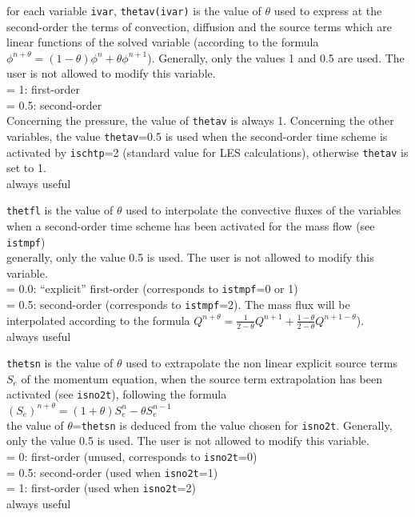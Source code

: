 {for each variable {\tt ivar}, {\tt thetav(ivar)} is the value of $\theta$ used to
express at the second-order the terms of convection, diffusion and the
source terms which are linear functions of the solved variable
(according to the formula
$\phi^{n+\theta}=(1-\theta)\phi^n+\theta\phi^{n+1}$). Generally,
only the values 1 and 0.5 are used. The user is not allowed to modify
this variable.\\
\hspace*{1.3cm}= 1: first-order \\
\hspace*{1.3cm}= 0.5: second-order \\
Concerning the pressure, the value of {\tt thetav} is always 1. Concerning
the other variables, the value {\tt thetav}=0.5 is used when the
second-order time scheme is activated by {\tt ischtp}=2 (standard value for
LES calculations), otherwise {\tt thetav} is set to 1.\\
always useful}

{{\tt thetfl} is the value of $\theta$ used to
interpolate the convective fluxes of the variables when a second-order time
scheme has been activated for the mass flow (see {\tt istmpf})\\
generally, only the value 0.5 is used. The user is not allowed to
modify this variable.\\
\hspace*{1.3cm}= 0.0: ``explicit'' first-order (corresponds to
{\tt istmpf}=0 or 1)\\
\hspace*{1.3cm}= 0.5: second-order (corresponds to {\tt istmpf}=2). The mass
flux will be interpolated according to the formula
$Q^{n+\theta}=\frac{1}{2-\theta}Q^{n+1}+\frac{1-\theta}{2-\theta}Q^{n+1-\theta}$).\\
always useful}

{{\tt thetsn} is the value of $\theta$ used to
extrapolate the non linear explicit source terms $S_e$ of the momentum equation,
when the source term extrapolation has been activated (see {\tt isno2t}),
following the formula\\
$(S_e)^{n+\theta}=(1+\theta)S_e^n-\theta S_e^{n-1}$\\
the value
of $\theta$={\tt thetsn} is deduced from the value chosen for
{\tt isno2t}. Generally, only the value 0.5 is used. The user is not
allowed to modify this variable.\\
\hspace*{1.3cm}= 0: first-order (unused, corresponds to {\tt isno2t}=0) \\
\hspace*{1.3cm}= 0.5: second-order (used when {\tt isno2t}=1) \\
\hspace*{1.3cm}= 1: first-order (used when {\tt isno2t}=2) \\
always useful}


